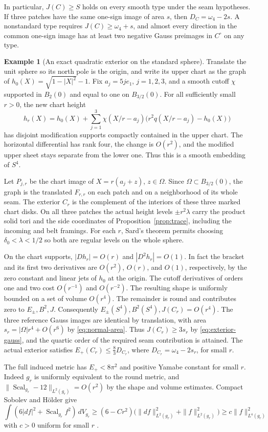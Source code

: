 \documentclass[11pt,letterpaper]{article}
\numberwithin{equation}{section}
\theoremstyle{definition}
\newtheorem{example}[theorem]{Example}
\DeclareMathOperator{\Scal}{Scal}
\begin{document}
In particular, \(J(C)\ge S\) holds on every smooth type under
the seam hypotheses. If three patches have the same one-sign
image of area \(s\), then \(D_C=\omega_4-2s\). A nonstandard
type requires \(J(C)\ge\omega_4+s\), and almost every direction
in the common one-sign image has at least two negative Gauss
preimages in \(C^\circ\) on any type.

\begin{example}[An exact quadratic exterior on the standard sphere]
\label{ex:exact-exterior}
Translate the unit sphere so its north pole is the origin, and
write its upper chart as the graph of \(h_0(X)=\sqrt{1-|X|^2}-1\).
Fix \(a_j=5je_1\), \(j=1,2,3\), and a smooth cutoff \(\chi\)
supported in \(B_2(0)\) and equal to one on \(B_{3/2}(0)\).
For all sufficiently small \(r>0\), the new chart height
\[
 h_r(X)=h_0(X)+\sum_{j=1}^3\chi(X/r-a_j)
        \bigl(r^2q(X/r-a_j)-h_0(X)\bigr)
\]
has disjoint modification supports compactly contained in the
upper chart. The horizontal differential has rank four, the
change is \(O(r^2)\), and the modified upper sheet stays separate
from the lower one. Thus this is a smooth embedding of \(S^4\).

Let \(P_{j,r}\) be the chart image of \(X=r(a_j+z)\), \(z\in\Omega\).
Since \(\Omega\subset B_{3/2}(0)\), the graph is the translated
\(F_{r,r}\) on each patch and on a neighborhood of its whole seam.
The exterior \(C_r\) is the complement of the interiors of these
three marked chart disks. On all three patches the actual height
levels \(\pm r^2\lambda\) carry the product solid tori and the
side coordinates of Proposition~\ref{prop:trace}, including the
incoming and belt framings. For each \(r\), Sard's theorem permits
choosing \(\delta_0<\lambda<1/2\) so both are regular levels on
the whole sphere.

On the chart supports, \(|Dh_r|=O(r)\) and \(|D^2h_r|=O(1)\).
In fact the bracket and its first two derivatives are \(O(r^2)\),
\(O(r)\), and \(O(1)\), respectively, by the zero constant and
linear jets of \(h_0\) at the origin. The cutoff derivatives of
orders one and two cost \(O(r^{-1})\) and \(O(r^{-2})\). The
resulting shape is uniformly bounded on a set of volume \(O(r^4)\).
The remainder is round and contributes zero to \(E_\pm,B^2,J\).
Consequently \(E_\pm(S^4),B^2(S^4),J(C_r)=O(r^4)\).
The three reference Gauss images are identical by translation,
with area \(s_r=|\Omega|r^4+O(r^6)\) by \eqref{eq:normal-area}.
Thus \(J(C_r)\ge3s_r\) by \eqref{eq:exterior-gauss}, and the
quartic order of the required seam contribution is attained.
The actual exterior satisfies \(E_+(C_r)\le\frac83D_{C_r}\),
where \(D_{C_r}=\omega_4-2s_r\), for small \(r\).

The full induced metric has \(E_+<8\pi^2\) and positive Yamabe
constant for small \(r\). Indeed \(g_r\) is uniformly equivalent
to the round metric, and
\(\|\Scal_{g_r}-12\|_{L^2(g_r)}=O(r^2)\) by the shape and volume
estimates. Compact Sobolev and Hölder give
\[
 \int (6|df|^2+\Scal_{g_r} f^2)\,dV_{g_r}
 \ge (6-Cr^2)\bigl(\|df\|_{L^2(g_r)}^2+\|f\|_{L^2(g_r)}^2\bigr)
 \ge c\|f\|_{L^4(g_r)}^2
\]
with \(c>0\) uniform for small \(r\)
\cite[(1.3)--(1.4) and Theorem 2.3]{LeeParker1987Yamabe}.
\end{example}
\end{document}
